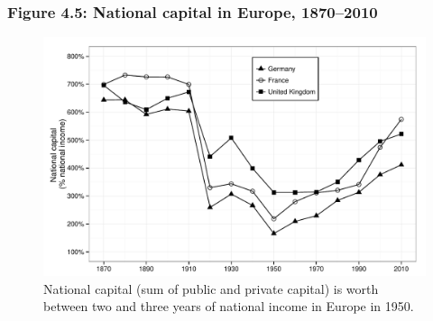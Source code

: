 \documentclass[t]{beamer}\usepackage[]{graphicx}\usepackage[]{color}
\newenvironment{knitrout}{}{} %
\begin{document}
\begin{frame}[label=Figure_4_5]
\frametitle{Figure 4.5: National capital in Europe, 1870--2010}
\begin{figure}[t]
\begin{minipage}[b]{\textwidth}
\centering
\begin{knitrout}\footnotesize
{}\color{fgcolor}

{\centering \includegraphics[width=1\linewidth]{figures/bw/Figure_4_5} 

}



\end{knitrout}
\caption{National capital (sum of public and private capital) is worth between two and three years of national income in Europe in 1950.}
\end{minipage}
\end{figure}
\end{frame}
\end{document}
